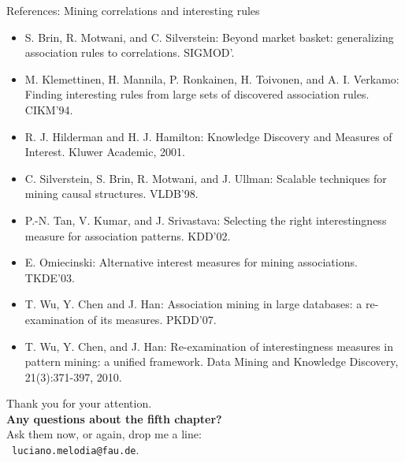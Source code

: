 \documentclass[aspectratio=169,t,xcolor=dvipsnames]{beamer}
\begin{document}
  {
    \begin{frame}{References: Mining correlations and interesting rules}
    \begin{itemize}
      \item S. Brin, R. Motwani, and C. Silverstein: Beyond market basket: generalizing association rules to correlations. SIGMOD'.
      \item M. Klemettinen, H. Mannila, P. Ronkainen, H. Toivonen, and A. I. Verkamo: Finding interesting rules from large sets of discovered association rules.  CIKM'94.
      \item R. J. Hilderman and H. J. Hamilton: Knowledge Discovery and Measures of Interest. Kluwer Academic, 2001.
      \item C. Silverstein, S. Brin, R. Motwani, and J. Ullman: Scalable techniques for mining causal structures. VLDB'98.
      \item P.-N. Tan, V. Kumar, and J. Srivastava: Selecting the right interestingness measure for association patterns. KDD'02.
      \item E. Omiecinski: Alternative interest measures for mining associations. TKDE'03.
      \item T. Wu, Y. Chen and J. Han: Association mining in large databases: a re-examination of its measures. PKDD'07.
      \item T. Wu, Y. Chen, and J. Han: Re-examination of interestingness measures in pattern mining: a unified framework. Data Mining and Knowledge Discovery, 21(3):371-397, 2010.
    \end{itemize}
    \end{frame}
  }

  { %
    \begin{frame}[c]
      \begin{center}
        Thank you for your attention.\\
        {\bf Any questions about the fifth chapter?}\\[0.5cm]
        Ask them now, or again, drop me a line: \\
        \faSendO \ \texttt{luciano.melodia@fau.de}.
      \end{center}
    \end{frame}
  }
\end{document}
